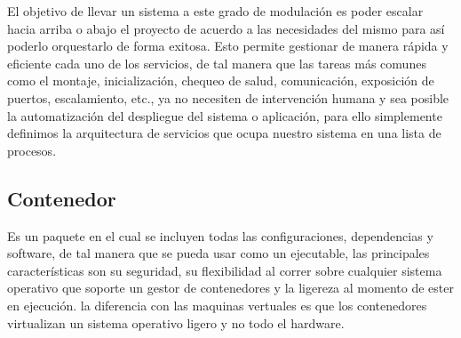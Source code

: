     El objetivo de llevar un sistema a este grado de modulación es poder escalar hacia arriba o abajo el proyecto de acuerdo a las necesidades del mismo para así poderlo orquestarlo de forma exitosa. Esto permite gestionar de manera rápida y eficiente cada uno de los servicios, de tal manera que las tareas más comunes como el montaje, inicialización, chequeo de salud, comunicación, exposición de puertos, escalamiento, etc., ya no necesiten de intervención humana y sea posible la automatización del despliegue del sistema o aplicación, para ello simplemente definimos la arquitectura de servicios que ocupa nuestro sistema en una lista de procesos.
    
    \subsection{Contenedor}
        Es un paquete en el cual se incluyen todas las configuraciones, dependencias y software, de tal manera que se pueda usar como un ejecutable, las principales características son su seguridad, su flexibilidad al correr sobre cualquier sistema operativo que soporte un gestor de contenedores y la ligereza al momento de ester en ejecución. la diferencia con las maquinas vertuales es que los contenedores virtualizan un sistema operativo ligero y no todo el hardware.
        

